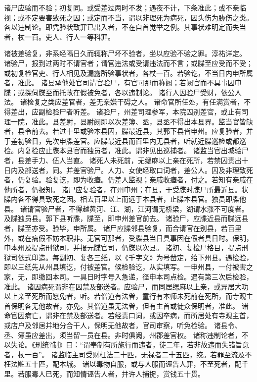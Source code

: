 \documentclass[12pt,UTF8]{ctexbook}
\begin{document}
诸尸应验而不验；初复同。或受差过两时不发；遇夜不计，下条准此；或不亲临视；或不定要害致死之因；或定而不当，谓以非理死为病死，因头伤为胁伤之类。各以违制论。即凭验状致罪已出入者，不在自首觉举之例。其事状难明定而失当者，杖一百。吏人、行人一等科罪。

诸被差验复，非系经隔日久而辄称尸坏不验者，坐以应验不验之罪。淳祐详定。
诸验尸，报到过两时不请官者；请官违法或受请违法而不言；或牒至应受而不受；或初复检官吏、行人相见及漏露所验事状者，各杖一百。若验讫，不当日内申所属者，准此。
诸县承他处官司请官验尸，有官可那而称阙；若阙官而不具事因申牒；或探伺牒至而托故在假被免者，各以违制论。
诸行人因验尸受财，依公人法。
诸检复之类应差官者，差无亲嫌干碍之人。
诸命官所任处，有任满赏者，不得差出，应副检验尸者听差。
诸验尸，州差司理参军，本院囚别差官，或止有司理一院，准此。县差尉，县尉阙即以次差簿、丞，县丞不得出本县界。监当官皆缺者，县令前去。若过十里或验本县囚，牒最近县，其郭下县皆申州。应复验者，并于差初验日，先次申牒差官。应牒最近县而百里内无县者，听就近牒巡检或都巡检。内复检应止牒本县官而独员者，准此。谓非见出巡捕者。
诸监当官出城验尸者，县差手力、伍人当直。
诸死人未死前，无缌麻以上亲在死所，若禁囚责出十日内及部送者，同。并差官验尸。人力、女使经取口词者，差公人。囚及非理致死者，仍复验。验复讫，即为收瘗。仍差人监视；亲戚收瘗者，付之。若知有亲戚在他所者，仍报知。
诸尸应复验者，在州申州；在县，于受牒时牒尸所最近县。状牒内各不得具致死之因。相去百里以上而远于本县者，止牒本县官。独员即牒他县。
诸请官验尸者，不得越黄河、江、湖，江河谓无桥梁，湖谓水涨不可度者。及牒独员县。郭下县听牒，牒至，即申州差官前去。
诸验尸，应牒近县而牒远县者，牒至亦受。验毕，申所属。
诸尸应牒邻县验复，而合请官在别县，若百里外，或在病假不妨本职非。无官可那者，受牒县当日具事因在假者具日时。保明，申本州及提点刑狱司，并报元牒官司，仍牒以次县。
诸初、复检尸格目，提点刑狱司依式印造。每副初、复各三纸，以《千字文》为号凿定，给下州县。遇检验，即以三纸先从州县填讫，付被差官。候检验讫，从实填写。一申州县，一付被害之家，无，即缴回本司。一具日时字号入急递，径申本司点检。遇有第三次后检验，准此。
诸因病死谓非在囚禁及部送者。应验尸，而同居缌麻以上亲，或异居大功以上亲至死所而愿免者，听。若僧道有法眷，童行有本师未死前在死所，而寺观主首保明各无他故者，亦免。其僧道虽无法眷，但有主首或徒众保明者，准此。
诸命官因病亡，谓非在禁及部送者。若经责口词，或因卒病，而所居处有寺观主首，或店户及邻居并地分合干人，保明无他故者，官司审察，听免检验。
诸县令、丞、簿虽应差出，须当留一员在县。非时俱阙，州郡差官权。
诸称违制论者，不以失论。《刑统?制》曰：“谓奉制有所施行而违者，徒二年，若非故违而失错旨意者，杖一百”。
诸监临主司受财枉法二十匹，无禄者二十五匹，绞。若罪至流及不枉法赃五十匹，配本城。
诸以毒物自服，或与人服而诬告人罪，不至死者，配千里。若服毒人已死，而知情诬告人者，并许人捕捉，赏钱五十贯。
\end{document}
